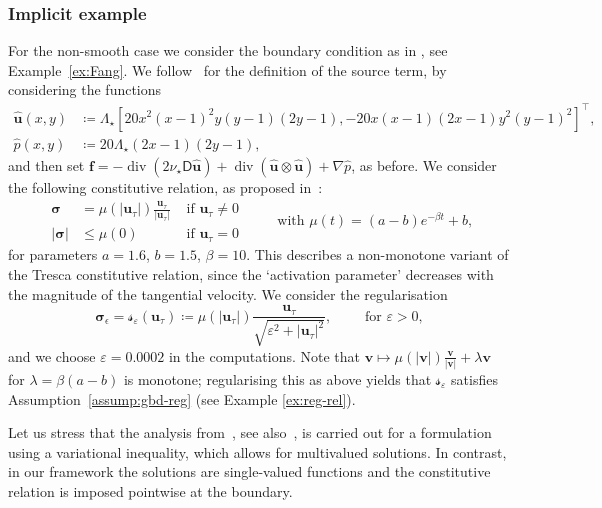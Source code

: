 \documentclass[reqno,a4paper]{amsart}
\def\abs#1{\left| #1 \right|}
\def\tens#1{\pmb{\mathsf{#1}}}
\def\vec#1{\boldsymbol{#1}}
\def\diver{\mathop{\mathrm{div}}\nolimits} %
\def\bu{\vec{u}}
\def\bv{\vec{v}}
\def\bsigma{\vec{\sigma}}
\def\BD{\tens{D}}
\def\Srel{\vec{\mathcal{s}}}
\def\Seps{\Srel_{\varepsilon}}
\begin{document}
	\subsubsection{Implicit example}
	\label{ex:non-monotone-tresca}
	For the non-smooth case we consider the boundary condition as in \cite{Fang2020}, see Example~\ref{ex:Fang}. 
	We follow~\cite{JHYW.2018} for the definition of the source term, by considering the functions
	\begin{equation}\label{eq:exact_solution}
		\begin{aligned}
			\hat{\bu}(x,y) &\coloneqq  \Lambda_\star[20x^2 (x-1)^2 y (y-1) (2y-1), -20x(x-1)(2x-1)y^2 (y-1)^2]^\top, \\
			\hat{p}(x,y) &\coloneqq 20\Lambda_\star(2x-1)(2y-1),
		\end{aligned}
	\end{equation}
	and then set $\bm{f}= -\diver(2\nu_\star \BD\hat{\bu}) + \diver(\hat{\bu}\otimes \hat{\bu}) + \nabla \hat{p}$, as before.
	We consider the following constitutive relation, as  proposed in~\cite{Fang2020}:
	\begin{equation}\label{eq:nonsmooth_nonmonotone}
		\begin{array}{rlr}
			\bsigma &= \mu(|\bu_\tau|)\frac{\bu_\tau}{|\bu_\tau|}  & \text{ if }\bu_\tau \neq 0  \\
			|\bsigma| &\leq \mu(0)  & \text{ if }\bu_\tau = 0
		\end{array}
		\qquad \text{ with  }
		\mu(t) = (a-b)e^{-\beta t} + b,
	\end{equation}
	for parameters $a=1.6$, $b=1.5$, $\beta=10$. 
	This describes a non-monotone variant of the Tresca constitutive relation, since the `activation parameter' decreases with the magnitude of the tangential velocity. 
	We consider the regularisation
	\begin{equation}
		\bsigma_\epsilon = \Seps(\bu_\tau) \coloneqq \mu(|\bu_\tau|) \frac{\bu_\tau}{\sqrt{\varepsilon^2 + |\bu_\tau|^2}}, 
		\qquad
		\text{ for } \varepsilon>0,
	\end{equation}
	and we choose $\varepsilon = 0.0002$ in the computations. 
	Note that $\bv \mapsto \mu(\abs{\bv}) \frac{\bv}{\abs{\bv}} + \lambda \bv$ for $\lambda = \beta(a - b)$ is monotone;
	regularising this as above yields that $\Seps$ satisfies Assumption~\ref{assump:gbd-reg} (see Example \ref{ex:reg-rel}).
	
	Let us stress that the analysis from~\cite{Fang2020}, see also~\cite{HCJ.2021}, is carried out for a formulation using a variational inequality, which allows for multivalued solutions. 
	In contrast, in our framework the solutions are single-valued functions and the constitutive relation is imposed pointwise at the boundary.
	
\end{document}
